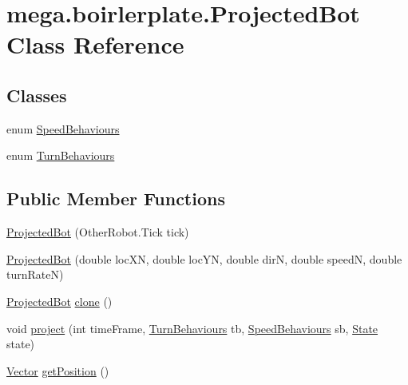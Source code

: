 \hypertarget{classmega_1_1boirlerplate_1_1_projected_bot}{}\section{mega.\+boirlerplate.\+Projected\+Bot Class Reference}
\label{classmega_1_1boirlerplate_1_1_projected_bot}
\subsection*{Classes}
\begin{DoxyCompactItemize}
\item 
enum \hyperlink{enummega_1_1boirlerplate_1_1_projected_bot_1_1_speed_behaviours}{Speed\+Behaviours}
\item 
enum \hyperlink{enummega_1_1boirlerplate_1_1_projected_bot_1_1_turn_behaviours}{Turn\+Behaviours}
\end{DoxyCompactItemize}
\subsection*{Public Member Functions}
\begin{DoxyCompactItemize}
\item 
\hyperlink{classmega_1_1boirlerplate_1_1_projected_bot_af1ec5b4d0031d1df15965b168e4e1db2}{Projected\+Bot} (Other\+Robot.\+Tick tick)
\item 
\hyperlink{classmega_1_1boirlerplate_1_1_projected_bot_a3e4bf3f307391c9dbd03c253e631ad0a}{Projected\+Bot} (double loc\+XN, double loc\+YN, double dirN, double speedN, double turn\+RateN)
\item 
\hyperlink{classmega_1_1boirlerplate_1_1_projected_bot}{Projected\+Bot} \hyperlink{classmega_1_1boirlerplate_1_1_projected_bot_a9a1bdfc9bb9c18555e5c38110a4dfae8}{clone} ()
\item 
void \hyperlink{classmega_1_1boirlerplate_1_1_projected_bot_a57c37c5aba55fa5c9ebe7bb2ca845756}{project} (int time\+Frame, \hyperlink{enummega_1_1boirlerplate_1_1_projected_bot_1_1_turn_behaviours}{Turn\+Behaviours} tb, \hyperlink{enummega_1_1boirlerplate_1_1_projected_bot_1_1_speed_behaviours}{Speed\+Behaviours} sb, \hyperlink{classmega_1_1boirlerplate_1_1_state}{State} state)
\item 
\hyperlink{classmega_1_1boirlerplate_1_1_vector}{Vector} \hyperlink{classmega_1_1boirlerplate_1_1_projected_bot_af4c577e26dc5cb14bd06ecff0ee8d708}{get\+Position} ()
\end{DoxyCompactItemize}
